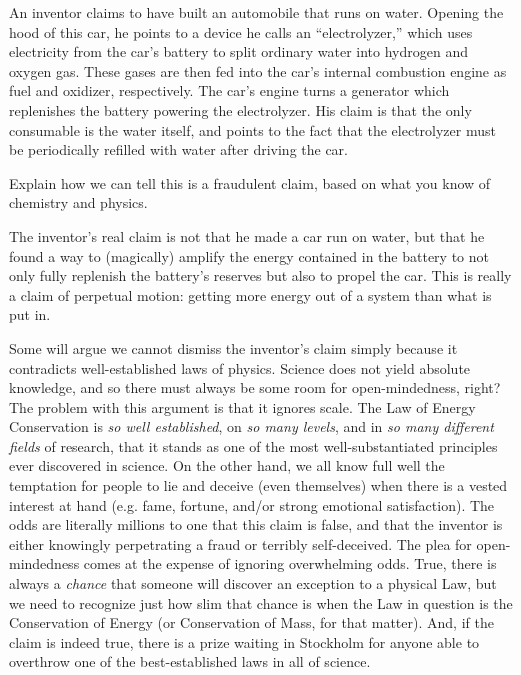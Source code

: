 

An inventor claims to have built an automobile that runs on water.  Opening the hood of this car, he points to a device he calls an ``electrolyzer,'' which uses electricity from the car's battery to split ordinary water into hydrogen and oxygen gas.  These gases are then fed into the car's internal combustion engine as fuel and oxidizer, respectively.  The car's engine turns a generator which replenishes the battery powering the electrolyzer.  His claim is that the only consumable is the water itself, and points to the fact that the electrolyzer must be periodically refilled with water after driving the car.

\vskip 10pt

Explain how we can tell this is a fraudulent claim, based on what you know of chemistry and physics.







The inventor's real claim is not that he made a car run on water, but that he found a way to (magically) amplify the energy contained in the battery to not only fully replenish the battery's reserves but also to propel the car.  This is really a claim of perpetual motion: getting more energy out of a system than what is put in.

Some will argue we cannot dismiss the inventor's claim simply because it contradicts well-established laws of physics.  Science does not yield absolute knowledge, and so there must always be some room for open-mindedness, right?  The problem with this argument is that it ignores scale.  The Law of Energy Conservation is {\it so well established}, on {\it so many levels}, and in {\it so many different fields} of research, that it stands as one of the most well-substantiated principles ever discovered in science.  On the other hand, we all know full well the temptation for people to lie and deceive (even themselves) when there is a vested interest at hand (e.g. fame, fortune, and/or strong emotional satisfaction).  The odds are literally millions to one that this claim is false, and that the inventor is either knowingly perpetrating a fraud or terribly self-deceived.  The plea for open-mindedness comes at the expense of ignoring overwhelming odds.  True, there is always a {\it chance} that someone will discover an exception to a physical Law, but we need to recognize just how slim that chance is when the Law in question is the Conservation of Energy (or Conservation of Mass, for that matter).  And, if the claim is indeed true, there is a prize waiting in Stockholm for anyone able to overthrow one of the best-established laws in all of science.

